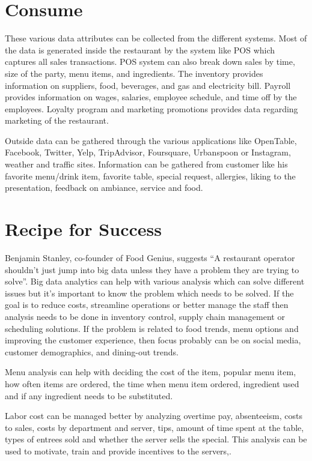 \documentclass[sigconf]{acmart}
\begin{document}
\section{Consume}
These various data attributes can be collected from the different systems. Most of the data is generated inside the restaurant by the system like POS which captures all sales transactions. POS system can also break down sales by time, size of the party, menu items, and ingredients. The inventory provides information on suppliers, food, beverages, and gas and electricity bill. Payroll provides information on wages, salaries, employee schedule, and time off by the employees. Loyalty program and marketing promotions provides data regarding marketing of the restaurant.


Outside data can be gathered through the various applications like OpenTable, Facebook, Twitter, Yelp, TripAdvisor, Foursquare, Urbanspoon or Instagram, weather and traffic sites. Information can be gathered from customer like his favorite menu/drink item, favorite table, special request, allergies, liking to the presentation, feedback on ambiance, service and food. \cite{www-restaurant}

\section{Recipe for Success}
Benjamin Stanley, co-founder of Food Genius, suggests ``A restaurant operator shouldn't just jump into big data unless they have a problem they are trying to solve''\cite{KooserAmandaC.2013BD}. Big data analytics can help with various analysis which can solve different issues but it's important to know the problem which needs to be solved. If the goal is to reduce costs, streamline operations or better manage the staff then analysis needs to be done in inventory control, supply chain management or scheduling solutions. If the problem is related to food trends, menu options and improving the customer experience, then focus probably can be on social media, customer demographics, and dining-out trends.
\cite{www-restaurant} 

Menu analysis can help with deciding the cost of the item, popular menu item, how often items are ordered, the time when menu item ordered, ingredient used and if any ingredient needs to be substituted\cite{KooserAmandaC.2013BD}.

Labor cost can be managed better by analyzing overtime pay, absenteeism, costs to sales, costs by department and server, tips, amount of time spent at the table, types of entrees sold and whether the server sells the special. This analysis can be used to motivate, train and provide incentives to the servers\cite{www-restaurant},\cite{KooserAmandaC.2013BD}. 
\end{document}
